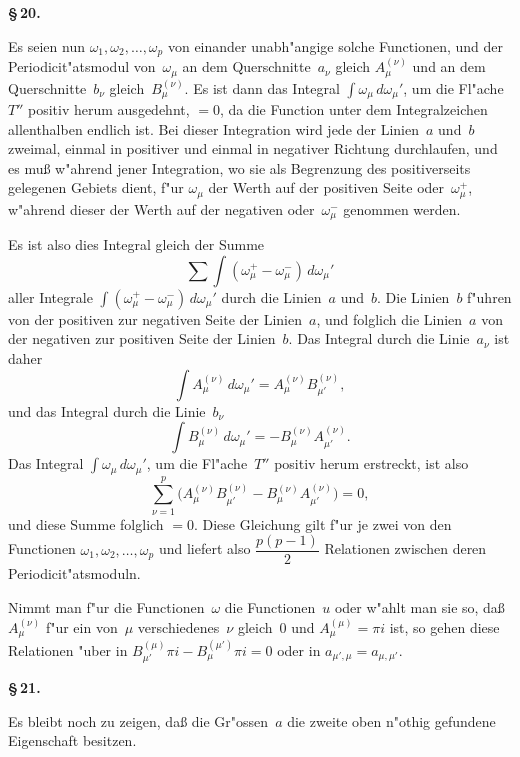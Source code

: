 \documentclass[12pt,a4paper]{book}
\theoremstyle{definition}
\theoremstyle{remark}
\begin{document}
\medskip
\textbf{\S\,20.}

Es seien nun $\omega_1, \omega_2, \ldots, \omega_p$ von einander unabh"angige solche
Functionen, und der Periodicit"atsmodul von~$\omega_\mu$ an dem Querschnitte~$a_\nu$
gleich $A_\mu^{(\nu)}$ und an dem Querschnitte~$b_\nu$ gleich~$B_\mu^{(\nu)}$.
Es ist dann das Integral $\int \omega_\mu\, d\omega_\mu'$, um die Fl"ache~$T''$
positiv herum ausgedehnt, $= 0$, da die Function unter dem Integralzeichen
allenthalben endlich ist. Bei dieser Integration wird jede der Linien~$a$
und~$b$ zweimal, einmal in positiver und einmal in negativer Richtung
durchlaufen, und es mu\ss{} w"ahrend jener Integration, wo sie als Begrenzung
des positiverseits gelegenen Gebiets dient, f"ur $\omega_\mu$ der Werth auf der
positiven Seite oder~$\omega_\mu^+$, w"ahrend dieser der Werth auf der negativen
oder~$\omega_\mu^-$ genommen werden.

Es ist also dies Integral gleich der Summe
\[
\sum \int (\omega_\mu^+ - \omega_\mu^-)\, d\omega_\mu'
\]
aller Integrale $\int (\omega_\mu^+ - \omega_\mu^-)\, d\omega_\mu'$ durch die Linien~$a$
und~$b$. Die Linien~$b$ f"uhren von der positiven zur negativen Seite
der Linien~$a$, und folglich die Linien~$a$ von der negativen zur positiven
Seite der Linien~$b$. Das Integral durch die Linie~$a_\nu$ ist daher
\[
\int A_\mu^{(\nu)}\, d\omega_\mu' = A_\mu^{(\nu)} B_{\mu'}^{(\nu)},
\]
und das Integral durch die Linie~$b_\nu$
\[
\int B_\mu^{(\nu)}\, d\omega_\mu' = -B_\mu^{(\nu)} A_{\mu'}^{(\nu)}.
\]
Das Integral $\int \omega_\mu\, d\omega_\mu'$, um die Fl"ache~$T''$ positiv herum
erstreckt, ist also
\[
\sum_{\nu=1}^{p} \bigl(A_\mu^{(\nu)} B_{\mu'}^{(\nu)}
  - B_\mu^{(\nu)} A_{\mu'}^{(\nu)}\bigr) = 0,
\]
und diese Summe folglich $= 0$. Diese Gleichung gilt f"ur je zwei von
den Functionen $\omega_1, \omega_2, \ldots, \omega_p$ und liefert also
$\dfrac{p(p-1)}{2}$ Relationen zwischen deren Periodicit"atsmoduln.

Nimmt man f"ur die Functionen~$\omega$ die Functionen~$u$ oder w"ahlt
man sie so, da\ss{} $A_\mu^{(\nu)}$ f"ur ein von~$\mu$ verschiedenes~$\nu$ gleich~$0$ und
$A_\mu^{(\mu)} = \pi i$ ist, so gehen diese Relationen "uber in
$B_{\mu'}^{(\mu)} \pi i - B_\mu^{(\mu')} \pi i = 0$ oder in $a_{\mu',\mu} = a_{\mu,\mu'}$.

\medskip
\textbf{\S\,21.}

Es bleibt noch zu zeigen, da\ss{} die Gr"ossen~$a$ die zweite oben
n"othig gefundene Eigenschaft besitzen.
\end{document}
